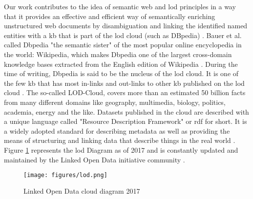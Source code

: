Our work contributes to the idea of semantic web and \ac{lod} principles in a way that it provides an effective and efficient way of semantically enriching unstructured web documents by disambiguation and linking the identified named entities with a \ac{kb} that is part of the \ac{lod} cloud (such as DBpedia) \cite{dbpedia}. Bauer et al. \cite{23} called Dbpedia "the semantic sister" of the most popular online encyclopedia in the world: Wikipedia, which makes Dbpedia one of the largest cross-domain knowledge bases extracted from the English edition of Wikipedia  \cite{23}. During the time of writing, Dbpedia is said to be the nucleus of the \ac{lod} cloud. It is one of the few \ac{kb} that has most in-links and out-links to other \ac{kb} published on the \ac{lod} cloud \cite{dbpedia, 23}. The so-called LOD-Cloud, covers more than an estimated 50 billion facts from many different domains like geography, multimedia, biology, politics, academia, energy and the like. Datasets published in the cloud are described with a unique language called "Resource Description Framework" or \ac{rdf} for short. It is a widely adopted standard for describing metadata as well as providing the means of structuring and linking data that describe things in the real world \cite{lod_sofar}. Figure \ref{fig:lod_diagram} represents the \ac{lod} Diagram as of 2017 and is constantly updated and maintained by the Linked Open Data initiative community \cite{lod-diagram}.

\begin{figure}[]
  \texttt{[image: figures/lod.png]}
  \caption{Linked Open Data cloud diagram 2017 \cite{lod-diagram}}
  \label{fig:lod_diagram}
\end{figure}
